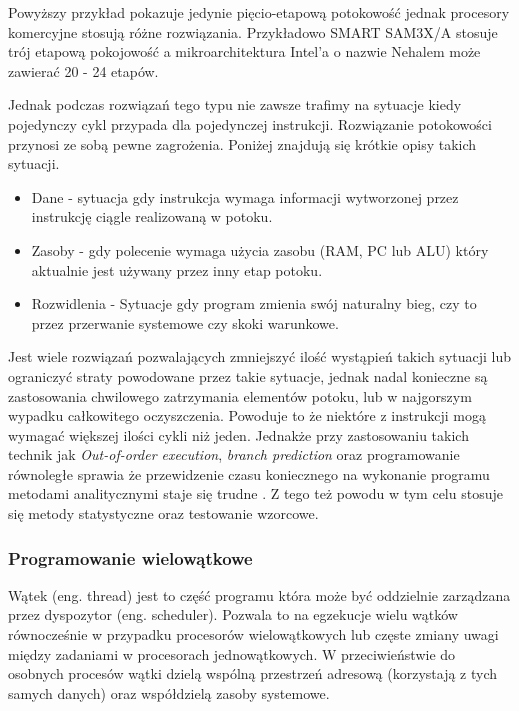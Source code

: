 Powyższy przykład pokazuje jedynie pięcio-etapową potokowość jednak procesory komercyjne stosują różne rozwiązania. Przykładowo SMART SAM3X/A stosuje trój etapową pokojowość\cite{datasheet} a mikroarchitektura Intel'a o nazwie Nehalem może zawierać 20 - 24 etapów\cite{pipelining intel}.

Jednak podczas rozwiązań tego typu nie zawsze trafimy na sytuacje kiedy pojedynczy cykl przypada dla pojedynczej instrukcji. 
Rozwiązanie potokowości przynosi ze sobą pewne zagrożenia. Poniżej znajdują się krótkie opisy takich sytuacji. 

\begin{itemize}
        \item Dane - sytuacja gdy instrukcja wymaga informacji wytworzonej przez instrukcję ciągle realizowaną w potoku. 
        \item Zasoby - gdy polecenie wymaga użycia zasobu (RAM, PC lub ALU) który aktualnie jest używany przez inny etap potoku. 
        \item Rozwidlenia - Sytuacje gdy program zmienia swój naturalny bieg, czy to przez przerwanie systemowe czy skoki warunkowe. 
\end{itemize}

Jest wiele rozwiązań pozwalających zmniejszyć ilość wystąpień takich sytuacji lub ograniczyć straty powodowane przez takie sytuacje, jednak nadal konieczne są zastosowania chwilowego zatrzymania elementów potoku, lub w najgorszym wypadku całkowitego oczyszczenia.
Powoduje to że niektóre z instrukcji mogą wymagać większej ilości cykli niż jeden. Jednakże przy zastosowaniu takich technik jak
\textit{Out-of-order execution}, \textit{branch prediction} oraz programowanie równoległe  sprawia że przewidzenie czasu koniecznego na wykonanie programu metodami analitycznymi staje się trudne . 
Z tego też powodu w tym celu stosuje się metody statystyczne oraz testowanie wzorcowe. 

\subsubsection{Programowanie wielowątkowe}

Wątek (eng. thread) jest to część programu która może być oddzielnie zarządzana przez dyspozytor (eng. scheduler). 
Pozwala to na egzekucje wielu wątków równocześnie w przypadku procesorów wielowątkowych lub częste zmiany uwagi między zadaniami w procesorach jednowątkowych.
W przeciwieństwie do osobnych procesów wątki dzielą wspólną przestrzeń adresową (korzystają z tych samych danych) oraz współdzielą zasoby systemowe.

